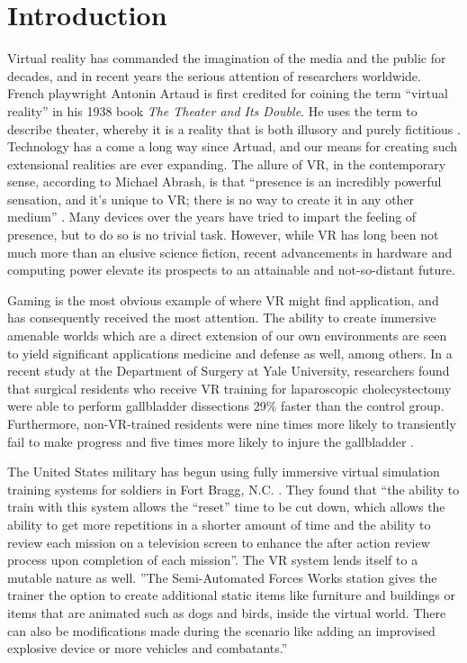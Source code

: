 \section{Introduction}
\label{sec:introduction}

Virtual reality has commanded the imagination of the media and the public for
decades, and in recent years the serious attention of researchers worldwide.
French playwright Antonin Artaud is first credited for coining the term
``virtual reality'' in his 1938 book \emph{The Theater and Its Double}. He uses
the term to describe theater, whereby it is a reality that is both illusory and
purely fictitious \cite{website:popularizeVR}. Technology has a come a long way
since Artuad, and our means for creating such extensional realities are ever
expanding. The allure of VR, in the contemporary sense, according to Michael
Abrash, is that ``presence is an incredibly powerful sensation, and it's unique
to VR; there is no way to create it in any other medium''
\cite{website:steampowered}.  Many devices over the years have tried to impart
the feeling of presence, but to do so is no trivial task. However, while VR has
long been not much more than an elusive science fiction, recent advancements in
hardware and computing power elevate its prospects to an attainable and
not-so-distant future. 

Gaming is the most obvious example of where VR might find application, and has
consequently received the most attention.  The ability to create immersive
amenable worlds which are a direct extension of our own environments are seen
to yield significant applications medicine and defense as well, among others.
In a recent study at the Department of Surgery at Yale University, researchers
found that surgical residents who receive VR training for laparoscopic
cholecystectomy were able to perform gallbladder dissections 29\% faster than
the control group. Furthermore, non-VR-trained residents were nine times more
likely to transiently fail to make progress and five times more likely to
injure the gallbladder \cite{seymour2002virtual}.

The United States military has begun using fully immersive virtual simulation
training systems for soldiers in Fort Bragg, N.C. \cite{website:army}. They
found that ``the ability to train with this system allows the ``reset'' time to
be cut down, which allows the ability to get more repetitions in a shorter
amount of time and the ability to review each mission on a television screen to
enhance the after action review process upon completion of each mission''.  The
VR system lends itself to a mutable nature as well. ''The Semi-Automated Forces
Works station gives the trainer the option to create additional static items
like furniture and buildings or items that are animated such as dogs and birds,
inside the virtual world. There can also be modifications made during the
scenario like adding an improvised explosive device or more vehicles and
combatants.''

